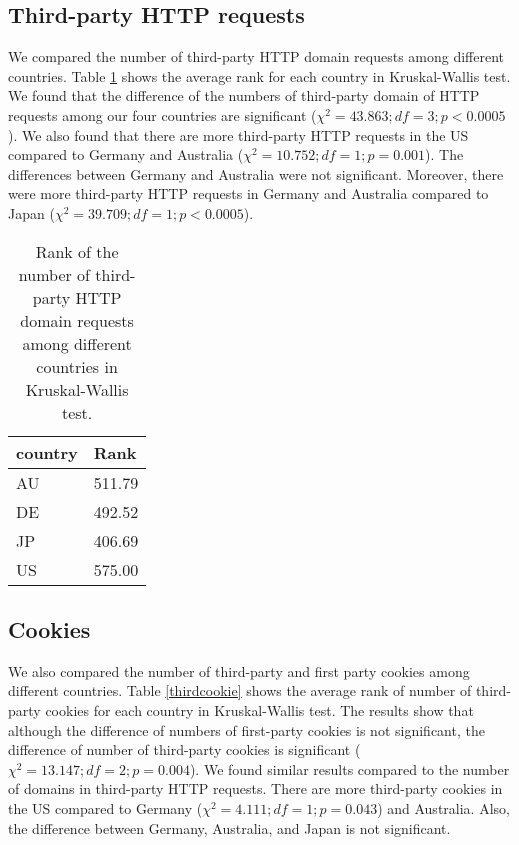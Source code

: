 \documentclass[journal]{IEEEtran}
\begin{document}
\subsection{Third-party HTTP requests}
We compared the number of third-party HTTP domain requests among different countries. 
Table \ref{thirdHTTP} shows the average rank for each country in Kruskal-Wallis test. We found that the difference of the numbers of third-party domain of HTTP requests among our four countries are significant ($\chi^{2} = 43.863; df = 3; p < 0.0005$). We also found that there are more third-party HTTP requests in the US compared to Germany and Australia ($\chi^{2} =10.752; df=1; p=0.001$). The differences between Germany and Australia were not significant. Moreover, there were more third-party HTTP requests in Germany and Australia compared to Japan ($\chi^{2} =39.709; df=1; p<0.0005$).

\begin{table}[t]
\centering
\caption{Rank of the number of third-party HTTP domain requests among different countries in Kruskal-Wallis test.}
\label{thirdHTTP}
\begin{tabular}{|l|l|}
\hline
\textbf{country} & \textbf{Rank} \\ \hline
AU               & 511.79        \\ \hline
DE               & 492.52        \\ \hline
JP               & 406.69        \\ \hline
US               & 575.00        \\ \hline
\end{tabular}
\end{table}

\subsection{Cookies}
We also compared the number of third-party and first party cookies among different countries. 
Table \ref{thirdcookie} shows the average rank of number of third-party cookies for each country in Kruskal-Wallis test. The results show that although the difference of numbers of first-party cookies is not significant, the difference of number of third-party cookies is significant ($\chi^{2}=13.147; df=2; p=0.004$).
We found similar results compared to the number of domains in third-party HTTP requests. There are more third-party cookies in the US compared to Germany ($\chi^{2} = 4.111; df=1; p=0.043$) and Australia. Also, the difference between Germany, Australia, and Japan is not significant.
\end{document}
